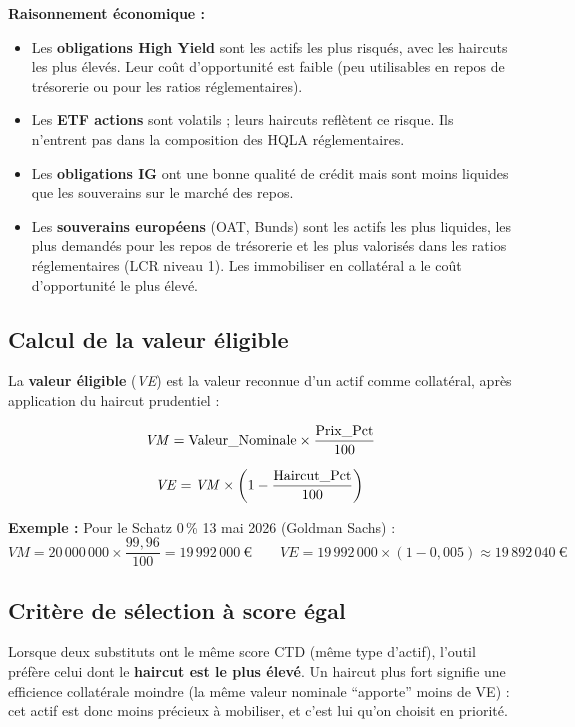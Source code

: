 \documentclass[12pt,a4paper]{article}
\newcommand{\VE}{\textit{VE}}
\newcommand{\VM}{\textit{VM}}
\begin{document}
\textbf{Raisonnement économique :}
\begin{itemize}
  \item Les \textbf{obligations High Yield} sont les actifs les plus risqués, avec les
    haircuts les plus élevés. Leur coût d'opportunité est faible (peu utilisables en
    repos de trésorerie ou pour les ratios réglementaires).
  \item Les \textbf{ETF actions} sont volatils ; leurs haircuts reflètent ce risque.
    Ils n'entrent pas dans la composition des HQLA réglementaires.
  \item Les \textbf{obligations IG} ont une bonne qualité de crédit mais sont moins
    liquides que les souverains sur le marché des repos.
  \item Les \textbf{souverains européens} (OAT, Bunds) sont les actifs les plus liquides,
    les plus demandés pour les repos de trésorerie et les plus valorisés dans les ratios
    réglementaires (LCR niveau 1). Les immobiliser en collatéral a le coût d'opportunité
    le plus élevé.
\end{itemize}

\subsection{Calcul de la valeur éligible}

La \textbf{valeur éligible} (\VE) est la valeur reconnue d'un actif comme collatéral,
après application du haircut prudentiel :

\begin{equation}
  \text{\VM} = \text{Valeur\_Nominale} \times \frac{\text{Prix\_Pct}}{100}
\end{equation}

\begin{equation}
  \text{\VE} = \text{\VM} \times \left(1 - \frac{\text{Haircut\_Pct}}{100}\right)
\end{equation}

\textbf{Exemple :} Pour le Schatz 0\,\% 13 mai 2026 (Goldman Sachs) :
\[
  \VM = 20\,000\,000 \times \frac{99{,}96}{100} = 19\,992\,000\ \euro
  \qquad
  \VE = 19\,992\,000 \times (1 - 0{,}005) \approx 19\,892\,040\ \euro
\]

\subsection{Critère de sélection à score égal}

Lorsque deux substituts ont le même score CTD (même type d'actif), l'outil préfère
celui dont le \textbf{haircut est le plus élevé}. Un haircut plus fort signifie une
efficience collatérale moindre (la même valeur nominale ``apporte'' moins de VE) :
cet actif est donc moins précieux à mobiliser, et c'est lui qu'on choisit en priorité.
\end{document}
